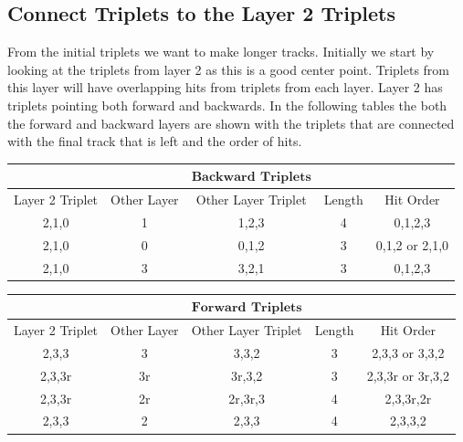 \subsection{Connect Triplets to the Layer 2 Triplets}
\label{3}
From the initial triplets we want to make longer tracks. Initially we start by looking at the triplets from layer 2 as this is a good center point. Triplets from this layer will have overlapping hits from triplets from each layer. Layer 2 has triplets pointing both forward and backwards. In the following tables the both the forward and backward layers are shown with the triplets that are connected with the final track that is left and the order of hits.
\vspace{0.3cm}
\begin{center}
\begin{tabular}{||c c c c c||}
 \hline
 & & $\boldsymbol{Backward}$ $\boldsymbol{Triplets}$& & \\
 \hline\hline
 Layer 2 Triplet & Other Layer & Other Layer Triplet & Length & Hit Order \\ [0.5ex] 
 \hline\hline
 2,1,0 & 1 & 1,2,3 & 4 & 0,1,2,3 \\ 
 \hline
 2,1,0 & 0 & 0,1,2 & 3 & 0,1,2 or 2,1,0 \\
 \hline
 2,1,0 & 3 & 3,2,1 & 3 & 0,1,2,3 \\
 \hline
\end{tabular}
\end{center}
\vspace{0.5cm}
\begin{center}
\begin{tabular}{||c c c c c||}
 \hline
 & & $\boldsymbol{Forward}$ $\boldsymbol{Triplets}$& & \\
 \hline\hline
 Layer 2 Triplet & Other Layer & Other Layer Triplet & Length & Hit Order \\ [0.5ex] 
 \hline\hline
 2,3,3 & 3 & 3,3,2 & 3 & 2,3,3 or 3,3,2 \\ 
 \hline
 2,3,3r & 3r & 3r,3,2 & 3 & 2,3,3r or 3r,3,2 \\
 \hline
 2,3,3r & 2r & 2r,3r,3 & 4 & 2,3,3r,2r \\
 \hline
 2,3,3 & 2 & 2,3,3 & 4 & 2,3,3,2 \\
 \hline
\end{tabular}
\end{center}
